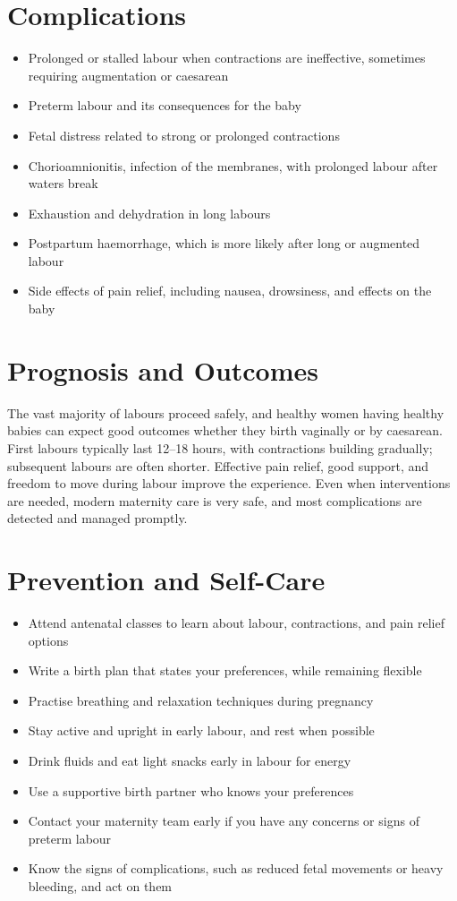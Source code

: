 \section*{Complications}
\begin{itemize}
    \item Prolonged or stalled labour when contractions are ineffective, sometimes requiring augmentation or caesarean
    \item Preterm labour and its consequences for the baby
    \item Fetal distress related to strong or prolonged contractions
    \item Chorioamnionitis, infection of the membranes, with prolonged labour after waters break
    \item Exhaustion and dehydration in long labours
    \item Postpartum haemorrhage, which is more likely after long or augmented labour
    \item Side effects of pain relief, including nausea, drowsiness, and effects on the baby
\end{itemize}

\section*{Prognosis and Outcomes}
The vast majority of labours proceed safely, and healthy women having healthy babies can expect good outcomes whether they birth vaginally or by caesarean. First labours typically last 12--18 hours, with contractions building gradually; subsequent labours are often shorter. Effective pain relief, good support, and freedom to move during labour improve the experience. Even when interventions are needed, modern maternity care is very safe, and most complications are detected and managed promptly.

\section*{Prevention and Self-Care}
\begin{itemize}
    \item Attend antenatal classes to learn about labour, contractions, and pain relief options
    \item Write a birth plan that states your preferences, while remaining flexible
    \item Practise breathing and relaxation techniques during pregnancy
    \item Stay active and upright in early labour, and rest when possible
    \item Drink fluids and eat light snacks early in labour for energy
    \item Use a supportive birth partner who knows your preferences
    \item Contact your maternity team early if you have any concerns or signs of preterm labour
    \item Know the signs of complications, such as reduced fetal movements or heavy bleeding, and act on them
\end{itemize}


